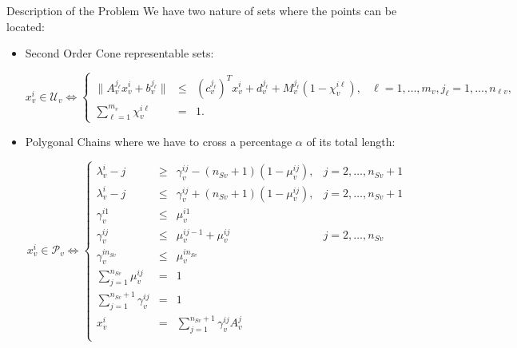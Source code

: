 \documentclass[slidestop,usepdftitle=false,10pt]{beamer}
\begin{document}
	\begin{frame}{Description of the Problem}
    We have two nature of sets where the points can be located:
    \bigskip
    \begin{itemize}
        \item Second Order Cone representable sets:
        \begin{tiny}
        \begin{equation}\label{U-C}\tag{$\mathcal U$-C}
             x_v^i\in \mathcal U_v \Longleftrightarrow
             \left\{
             \begin{array}{cclr}
              \|A_v^{j_\ell} x_v^i + b_v^{j_\ell}\|& \leq & (c_v^{j_\ell})^T x_v^i + d_v^{j_\ell}+ M_v^{j_\ell}(1-\chi_v^{i\ell}), & \ell=1,\ldots,m_v, j_\ell=1,\ldots,n_{\ell v}, \\
             \sum_{\ell = 1}^{m_v} \chi_v^{i\ell}  & =    & 1.
             \end{array}
             \right.
        \end{equation}
        \end{tiny}
        \item Polygonal Chains where we have to cross a percentage $\alpha$ of its total length:
        \begin{tiny}
        \begin{equation}\label{P-C}\tag{$\mathcal P$-C}
             x_v^i\in \mathcal P_v \Longleftrightarrow
             \left\{
             \begin{array}{cclr}
              \lambda_v^i - j                    & \geq & \gamma_v^{ij} - (n_{Sv}+1)(1-\mu_v^{ij}),                            & j=2,\ldots,n_{Sv}+1 \\
              \lambda_v^i - j                    & \leq & \gamma_v^{ij} + (n_{Sv}+1)(1-\mu_v^{ij}),                            & j=2,\ldots,n_{Sv}+1 \\
              \gamma_v^{i1}                      & \leq & \mu_v^{i1} & \\
              \gamma_v^{ij}                      & \leq & \mu_v^{ij-1} + \mu_v^{ij}                                         & j=2,\ldots,n_{Sv}\\
              \gamma_v^{in_{Sv}}                    & \leq & \mu_v^{in_{Sv}} \\
              \sum_{j = 1}^{n_{Sv}} \mu_v^{ij}      & =    & 1 \\
              \sum_{j = 1}^{n_{Sv}+1} \gamma_v^{ij} & =    & 1 \\
              x_v^i                              & = & \sum_{j=1}^{n_{Sv}+1}\gamma_v^{ij}A_v^j \\

\end{array}
\end{equation}
\end{tiny}
\end{itemize}
\end{frame}
\end{document}
